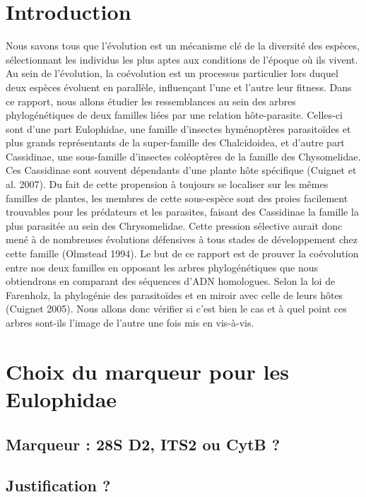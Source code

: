 \documentclass[a4paper, 11pt]{article}
\begin{document}
\section{Introduction}
Nous savons tous que l’évolution est un mécanisme clé de la diversité des espèces, sélectionnant les individus les plus aptes aux conditions de l’époque où ils vivent. Au sein de l’évolution, la coévolution est un processus particulier lors duquel deux espèces évoluent en parallèle, influençant l’une et l’autre leur fitness. Dans ce rapport, nous allons étudier les ressemblances au sein des arbres phylogénétiques de deux familles liées par une relation hôte-parasite. Celles-ci sont d’une part Eulophidae, une famille d’insectes hyménoptères parasitoïdes et plus grands représentants de la super-famille des Chalcidoidea, et d’autre part Cassidinae, une sous-famille d’insectes coléoptères de la famille des Chysomelidae. Ces Cassidinae sont souvent dépendants d’une plante hôte spécifique (Cuignet et al. 2007). Du fait de cette propension à toujours se localiser sur les mêmes familles de plantes, les membres de cette sous-espèce sont des proies facilement trouvables pour les prédateurs et les parasites, faisant des Cassidinae la famille la plus parasitée au sein des Chrysomelidae. Cette pression sélective aurait donc mené à de nombreuses évolutions défensives à tous stades de développement chez cette famille (Olmstead 1994).
Le but de ce rapport est de prouver la coévolution entre nos deux familles en opposant les arbres phylogénétiques que nous obtiendrons en comparant des séquences d’ADN homologues. Selon la loi de Farenholz, la phylogénie des parasitoïdes et en miroir avec celle de leurs hôtes (Cuignet 2005). Nous allons donc vérifier si c’est bien le cas et à quel point ces arbres sont-ils l’image de l’autre une fois mis en vis-à-vis.


\section{Choix du marqueur pour les Eulophidae}

\subsection{Marqueur : 28S D2, ITS2 ou CytB ?} 

\subsection{Justification ?}
\end{document}
